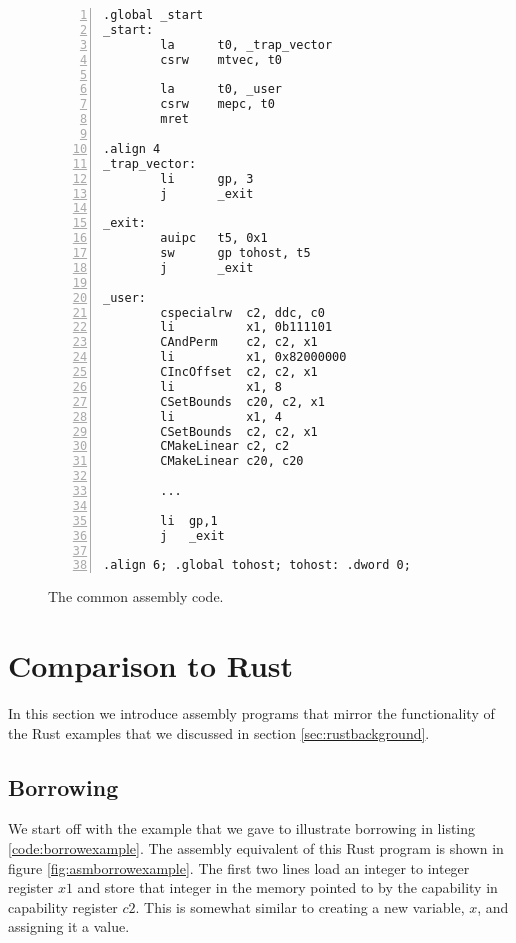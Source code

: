 \begin{figure}[h]
\begin{lstlisting}[style=custASM, numbers = left ,xleftmargin=1.5em]
        .global _start
_start:
        la      t0, _trap_vector
        csrw	mtvec, t0

        la      t0, _user
        csrw    mepc, t0
        mret

.align 4
_trap_vector:
        li      gp, 3
        j       _exit

_exit:
        auipc   t5, 0x1
        sw      gp tohost, t5
        j       _exit

_user:
        cspecialrw  c2, ddc, c0
        li          x1, 0b111101
        CAndPerm    c2, c2, x1
        li          x1, 0x82000000
        CIncOffset  c2, c2, x1
        li          x1, 8
        CSetBounds  c20, c2, x1
        li          x1, 4
        CSetBounds  c2, c2, x1
        CMakeLinear c2, c2
        CMakeLinear c20, c20
        
        ...
        
        li  gp,1
        j   _exit

.align 6; .global tohost; tohost: .dword 0;
\end{lstlisting}
\caption{The common assembly code.}
\label{fig:commonasm}
\end{figure}

\section{Comparison to Rust}
In this section we introduce assembly programs that mirror the functionality of the Rust examples that we discussed in section \ref{sec:rustbackground}.
\subsection{Borrowing}
We start off with the example that we gave to illustrate borrowing in listing \ref{code:borrowexample}.
The assembly equivalent of this Rust program is shown in figure \ref{fig:asmborrowexample}.
The first two lines load an integer to integer register $x1$ and store that integer in the memory pointed to by the capability in capability register $c2$.
This is somewhat similar to creating a new variable, $x$, and assigning it a value.


